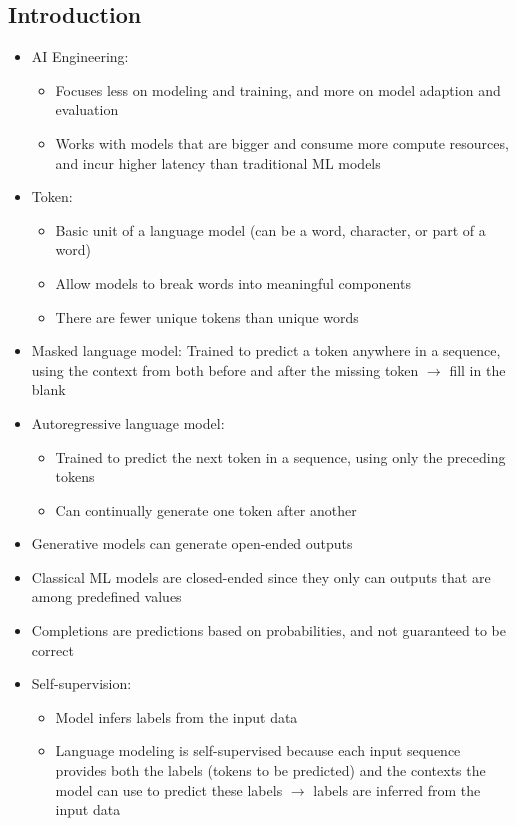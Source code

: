 \documentclass[11pt]{scrartcl}
\begin{document}
\subsection*{Introduction}
\begin{itemize}
	\item AI Engineering:
	\begin{itemize}
		\item Focuses less on modeling and training, and more on model adaption and evaluation
		\item Works with models that are bigger and consume more compute resources, and incur higher latency than traditional ML models
	\end{itemize}
	\item Token: 
	\begin{itemize}
		\item Basic unit of a language model (can be a word, character, or part of a word)
		\item Allow models to break words into meaningful components
		\item There are fewer unique tokens than unique words
	\end{itemize}
	\item Masked language model: Trained to predict a token anywhere in a sequence, using the context from both before and after the missing token $\to$ fill in the blank
	\item Autoregressive language model: 
	\begin{itemize}
		\item Trained to predict the next token in a sequence, using only the preceding tokens
		\item Can continually generate one token after another
	\end{itemize}
	\item Generative models can generate open-ended outputs
	\item Classical ML models are closed-ended since they only can outputs that are among predefined values
	\item Completions are predictions based on probabilities, and not guaranteed to be correct
	\item Self-supervision:
	\begin{itemize}
		\item Model infers labels from the input data
		\item Language modeling is self-supervised because each input sequence provides both the labels (tokens to be predicted) and the contexts the model can use to predict these labels $\to$ labels are inferred from the input data

\end{itemize}
\end{itemize}
\end{document}
